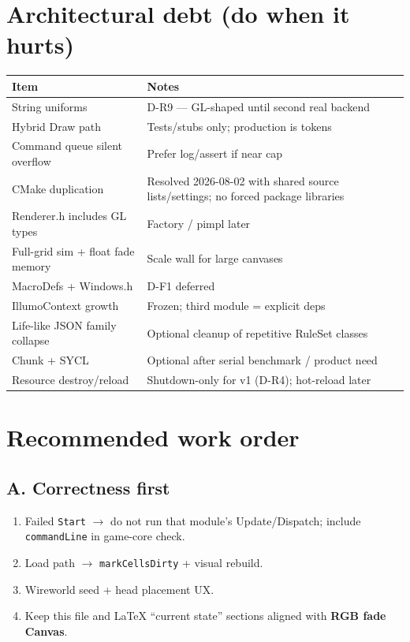 \documentclass[10pt,a4paper]{article}
\begin{document}
\section{Architectural debt (do when it hurts)}
\begin{table}[h!]
\centering
\small
\begin{tabularx}{\textwidth}{l X}
\toprule
\textbf{Item} & \textbf{Notes} \\
\midrule
String uniforms & D-R9 --- GL-shaped until second real backend \\
Hybrid Draw path & Tests/stubs only; production is tokens \\
Command queue silent overflow & Prefer log/assert if near cap \\
CMake duplication & Resolved 2026-08-02 with shared source lists/settings; no forced package libraries \\
Renderer.h includes GL types & Factory / pimpl later \\
Full-grid sim + float fade memory & Scale wall for large canvases \\
MacroDefs + Windows.h & D-F1 deferred \\
IllumoContext growth & Frozen; third module = explicit deps \\
Life-like JSON family collapse & Optional cleanup of repetitive RuleSet classes \\
Chunk + SYCL & Optional after serial benchmark / product need \\
Resource destroy/reload & Shutdown-only for v1 (D-R4); hot-reload later \\
\bottomrule
\end{tabularx}
\end{table}

\section{Recommended work order}

\subsection{A. Correctness first}
\begin{enumerate}
    \item Failed \texttt{Start} $\rightarrow$ do not run that module's Update/Dispatch; include \texttt{commandLine} in game-core check.
    \item Load path $\rightarrow$ \texttt{markCellsDirty} + visual rebuild.
    \item Wireworld seed + head placement UX.
    \item Keep this file and LaTeX ``current state'' sections aligned with \textbf{RGB fade Canvas}.
\end{enumerate}
\end{document}

